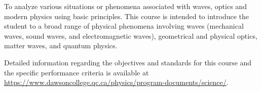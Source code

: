 {To analyze various situations or phenomena associated with waves, optics and modern physics using basic principles. This course is intended to introduce the student to a broad range of physical phenomena involving waves (mechanical waves, sound waves, and electromagnetic waves), geometrical and physical optics, matter waves, and quantum physics. 
\smallskip

Detailed information regarding the objectives and standards for this course and the specific performance criteria is available at \url{https://www.dawsoncollege.qc.ca/physics/program-documents/science/}.}
